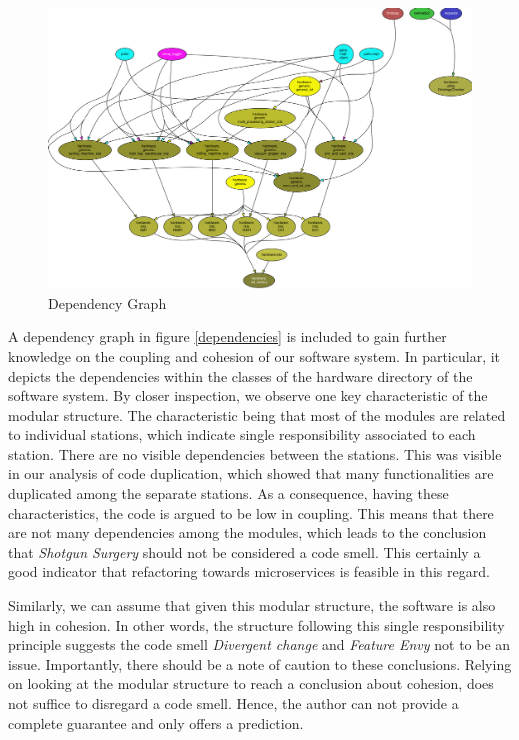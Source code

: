 \begin{figure}[H]
    \centering
    \includegraphics[width=\textwidth]{./assets/hardware}
    \caption{Dependency Graph}
    \label{dependencies}
    \label{fig:pre-refactor}
\end{figure}
A dependency graph in figure \ref{dependencies} is included to gain further knowledge on the coupling and cohesion of our software system. In particular, it depicts the dependencies within the classes of the hardware directory of the software system. By closer inspection, we observe one key characteristic of the modular structure. The characteristic being that most of the modules are related to individual stations, which indicate single responsibility associated to each station. There are no visible dependencies between the stations. This was visible in our analysis of code duplication, which showed that many functionalities are duplicated among the separate stations. As a consequence, having these characteristics, the code is argued to be low in coupling. This means that there are not many dependencies among the modules, which leads to the conclusion that \emph{Shotgun Surgery} should not be considered a code smell. This certainly a good indicator that refactoring towards microservices is feasible in this regard. 

Similarly, we can assume that given this modular structure, the software is also high in cohesion. In other words, the structure following this single responsibility principle suggests the code smell \emph{Divergent change} and \emph{Feature Envy} not to be an issue. Importantly, there should be a note of caution to these conclusions. Relying on looking at the modular structure to reach a conclusion about cohesion, does not suffice to disregard a code smell. Hence, the author can not provide a complete guarantee and only offers a prediction.

